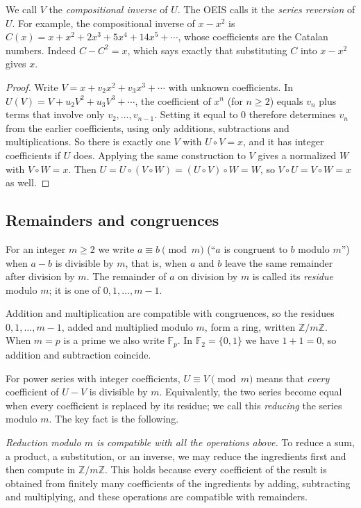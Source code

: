 \documentclass[11pt,a4paper]{article}
\theoremstyle{definition}
\theoremstyle{remark}
\newcommand{\Z}{\mathbb{Z}}
\newcommand{\F}{\mathbb{F}}
\begin{document}
We call $V$ the \emph{compositional inverse} of $U$. The OEIS calls it the \emph{series reversion} of $U$. For example,
the compositional inverse of $x-x^2$ is $C(x)=x+x^2+2x^3+5x^4+14x^5+\cdots$, whose coefficients are the Catalan numbers.
Indeed $C-C^2=x$, which says exactly that substituting $C$ into $x-x^2$ gives $x$.

\begin{proof}
Write $V=x+v_2x^2+v_3x^3+\cdots$ with unknown coefficients. In
$U(V)=V+u_2V^2+u_3V^3+\cdots$, the coefficient of $x^n$ (for $n\ge2$) equals $v_n$ plus terms that involve only
$v_2,\dots,v_{n-1}$. Setting it equal to $0$ therefore determines $v_n$ from the earlier coefficients, using only
additions, subtractions and multiplications. So there is exactly one $V$ with $U\circ V=x$, and it has integer
coefficients if $U$ does. Applying the same construction to $V$ gives a normalized $W$ with $V\circ W=x$. Then
$U=U\circ(V\circ W)=(U\circ V)\circ W=W$, so $V\circ U=V\circ W=x$ as well.
\end{proof}

\subsection{Remainders and congruences}
For an integer $m\ge2$ we write $a\equiv b\pmod m$ (``$a$ is congruent to $b$ modulo $m$'') when $a-b$ is divisible by
$m$, that is, when $a$ and $b$ leave the same remainder after division by $m$. The remainder of $a$ on division by
$m$ is called its \emph{residue} modulo $m$; it is one of $0,1,\dots,m-1$.

Addition and multiplication are compatible with congruences, so the residues $0,1,\dots,m-1$, added and multiplied
modulo $m$, form a ring, written $\Z/m\Z$. When $m=p$ is a prime we also write $\F_p$. In $\F_2=\{0,1\}$ we have $1+1=0$,
so addition and subtraction coincide.

For power series with integer coefficients, $U\equiv V\pmod m$ means that \emph{every} coefficient of $U-V$ is
divisible by $m$. Equivalently, the two series become equal when every coefficient is replaced by its residue; we call
this \emph{reducing} the series modulo $m$. The key fact is the following.

\emph{Reduction modulo $m$ is compatible with all the operations above.} To reduce a sum, a product, a substitution, or
an inverse, we may reduce the ingredients first and then compute in $\Z/m\Z$. This holds because every
coefficient of the result is obtained from finitely many coefficients of the ingredients by adding, subtracting and
multiplying, and these operations are compatible with remainders.
\end{document}
